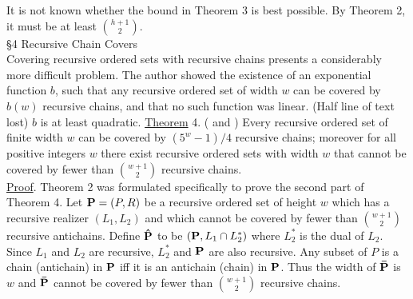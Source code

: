 \documentclass[twoside]{article}
\begin{document}
It is not known whether the bound in Theorem 3 is best possible. By Theorem 2, it must be at least $\binom{h+1}{2}$.\\


\noindent\S 4 Recursive Chain Covers\\


Covering recursive ordered sets with recursive chains presents a considerably more difficult problem.   The author showed the existence of an exponential function   $b$, such that any recursive ordered set of width   $w$ can be covered by   $b(w)$   recursive chains, and that no such function was linear.
(Half line of text lost) $b$	is at least quadratic.
\newpage
%
%
\noindent\underline{Theorem} 4.    (\cite{Kierstead81a} and \cite{Szemeredi82}) Every recursive ordered set of finite width   $w$   can be covered by $(5^w   - 1)/4$   recursive chains; moreover for all positive integers    $w$    there exist recursive ordered sets with width   $w$     that cannot be covered by fewer than  $\binom{w+1}{2}$ recursive chains.\\
\newline
\underline{Proof}.     Theorem 2 was formulated specifically to prove the second part of 
Theorem 4.    Let    $\mathbf{P} = (P,R)$ be a recursive ordered set of height $w$ which has a
recursive realizer   $(L_1,L_2)$ and which cannot be covered by fewer than $\binom{w+1}{2}$
recursive antichains.    Define   $\mathbf{\hat{P}}$   to be $(\mathbf{P},L_1\cap L_2^*)$ where	$L_2^*$ is the dual of
$L_2$.    Since   $L_1$   and   $L_2$   are recursive,  $L_2^*$     and $\mathbf{P}$   are also recursive. Any subset of   $P$   is a chain (antichain) in   $\mathbf{P}$   iff it is an antichain (chain) in $\mathbf{P}$.    
Thus the width of   $\mathbf{\bar{P}}$   is   $w$   and   $\mathbf{\bar{P}}$   cannot be covered by fewer than $\binom{w+1}{2}$ recursive chains.\\
\end{document}
